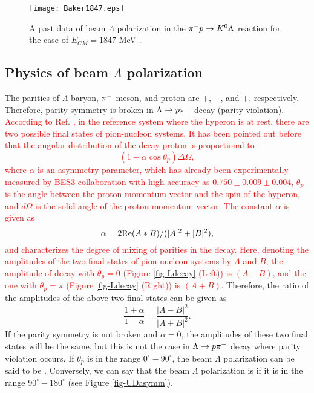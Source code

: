 \begin{figure}[h]
  \centering
  \texttt{[image: Baker1847.eps]}
  \caption{A past data of beam $\Lambda$ polarization in the $\pi^- p \to K^0 \Lambda$ reaction for the case of $E_{CM}=1847$ MeV \cite{Baker}.}
  \label{fig-Baker1847}
\end{figure}

\subsection{Physics of beam $\Lambda$ polarization}
\label{sec-Pl-phys}

The parities of $\Lambda$ baryon, $\pi^{-}$ meson, and proton are $+$, $-$, and $+$, respectively. Therefore, parity symmetry is broken in $\Lambda\to p\pi^{-}$ decay (parity violation). \textcolor{red}{ According to Ref. \cite{Lee1957}, in the reference system where the hyperon is at rest, there are two possible final states of pion-nucleon systems. It has been pointed out before \cite{Weldman} that the angular distribution of the decay proton is proportional to 
\begin{equation}
  (1-\alpha\cos{\theta_{p}}) \Delta\Omega,
\end{equation}
where $\alpha$ is an asymmetry parameter, which has already been experimentally measured by BES3 collaboration \cite{Alpha} with high accuracy as $0.750\pm0.009\pm0.004$, $\theta_{p}$ is the angle between the proton momentum vector and the spin of the hyperon, and $d\Omega$ is the solid angle of the proton momentum vector. The constant $\alpha$ is given as 
\begin{equation}
  \alpha = 2 {\rm Re}(A*B) / (|A|^{2} + |B|^{2}),
\end{equation}
and characterizes the degree of mixing of parities in the decay. Here, denoting the amplitudes of the two final states of pion-nucleon systems by $A$ and $B$, the amplitude of decay with $\theta_{p}=0$ (Figure \ref{fig-Ldecay} (Left)) is $(A-B)$, and the one with $\theta_{p}=\pi$ (Figure \ref{fig-Ldecay} (Right)) is $(A+B)$. } Therefore, the ratio of the amplitudes of the above two final states can be given as
\begin{equation}
  \frac{1+\alpha}{1-\alpha} = \frac{|A-B|^{2}}{|A+B|^{2}}.
\end{equation}
If the parity symmetry is not broken and $\alpha=0$, the amplitudes of these two final states will be the same, but this is not the case in $\Lambda\to p\pi^{-}$ decay where parity violation occurs. If $\theta_{p}$ is in the range $0^{\circ}-90^{\circ}$, the beam $\Lambda$ polarization can be said to be . Conversely, we can say that the beam $\Lambda$ polarization is  if it is in the range $90^{\circ}-180^{\circ}$ (see Figure \ref{fig-UDasymm}). 

